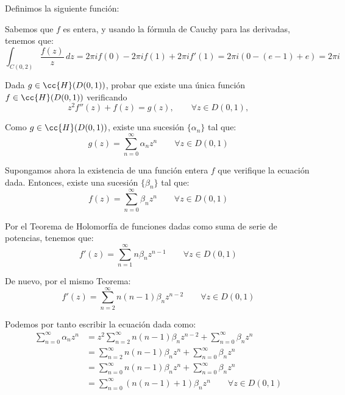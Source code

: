\documentclass[12pt]{article}
\begin{document}
\begin{ejercicio}
\begin{enumerate}
            Definimos la siguiente función:

            Sabemos que $f$ es entera, y usando la fórmula de Cauchy para las derivadas, tenemos que:
            \begin{equation*}
                \int_{C(0,2)} \dfrac{f(z)}{z} \, dz = 2\pi i f(0) - 2\pi i f(1) + 2\pi i f'(1) = 2\pi i \left(0 - (e-1) + e\right) = 2\pi i
            \end{equation*}
        \end{enumerate}
    \end{ejercicio}

    \begin{ejercicio}[3.5 puntos]
        Dada $g\in \cc{H}(D(0,1))$, probar que existe una única función $f\in \cc{H}(D(0,1))$ verificando
        \begin{equation*}
            z^2f''(z)+ f(z) = g(z),\qquad \forall z\in D(0,1),
        \end{equation*}

        Como $g\in \cc{H}(D(0,1))$, existe una sucesión $\{\alpha_n\}$ tal que:
        \begin{equation*}
            g(z) = \sum_{n=0}^{\infty} \alpha_n z^n \qquad \forall z\in D(0,1)
        \end{equation*}

        Supongamos ahora la existencia de una función entera $f$ que verifique la ecuación dada. Entonces, existe una sucesión $\{\beta_n\}$ tal que:
        \begin{equation*}
            f(z) = \sum_{n=0}^{\infty} \beta_n z^n \qquad \forall z\in D(0,1)
        \end{equation*}

        Por el Teorema de Holomorfía de funciones dadas como suma de serie de potencias, tenemos que:
        \begin{equation*}
            f'(z) = \sum_{n=1}^{\infty} n \beta_n z^{n-1} \qquad \forall z\in D(0,1)
        \end{equation*}

        De nuevo, por el mismo Teorema:
        \begin{equation*}
            f'(z) = \sum_{n=2}^{\infty} n(n-1) \beta_n z^{n-2} \qquad \forall z\in D(0,1)
        \end{equation*}

        Podemos por tanto escribir la ecuación dada como:
        \begin{align*}
            \sum_{n=0}^{\infty} \alpha_n z^n &= z^2\sum_{n=2}^{\infty} n(n-1) \beta_n z^{n-2} + \sum_{n=0}^{\infty} \beta_n z^n\\
            &= \sum_{n=2}^{\infty} n(n-1) \beta_n z^n + \sum_{n=0}^{\infty} \beta_n z^n\\
            &= \sum_{n=0}^{\infty} n(n-1) \beta_n z^n + \sum_{n=0}^{\infty} \beta_n z^n\\
            &= \sum_{n=0}^{\infty} (n(n-1)+1)\beta_n z^n\qquad \forall z\in D(0,1)
        \end{align*}


\end{ejercicio}
\end{document}
